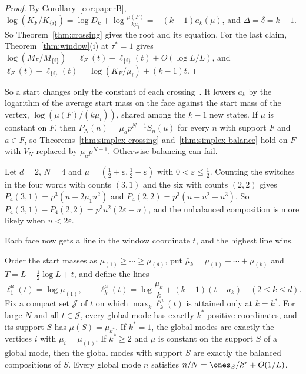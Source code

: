 \begin{proof}
By Corollary~\ref{cor:paperB}, $\log(K_F/K_{\{i\}})=\log D_k+\log\frac{\mu(F)}{k\mu_i}=-(k-1)a_k(\mu)$,
and $\Delta=\delta=k-1$. So Theorem~\ref{thm:crossing} gives the root and its equation. For the
last claim, Theorem~\ref{thm:window}(i) at $\tau^*=1$ gives
$\log(M_F/M_{\{i\}})=\ell_F(t)-\ell_{\{i\}}(t)+O(\log L/L)$, and
$\ell_F(t)-\ell_{\{i\}}(t)=\log(K_F/\mu_i)+(k-1)t$.
\end{proof}

So a start changes only the constant of each crossing~\cite[Theorem~4.4]{paperB}. It lowers
$a_k$ by the logarithm of the average start mass on the face against the start mass of the
vertex, $\log(\mu(F)/(k\mu_i))$, shared among the $k-1$ new states.
If $\mu$ is constant on $F$, then $P_N(n)=\mu_ap^{N-1}S_n(u)$ for every $n$ with support $F$
and $a\in F$, so Theorems~\ref{thm:simplex-crossing} and~\ref{thm:simplex-balance} hold on $F$
with $V_N$ replaced by $\mu_ap^{N-1}$. Otherwise balancing can fail.

\begin{remark}\label{ex:start-balance}
Let $d=2$, $N=4$ and $\mu=(\frac12+\varepsilon,\frac12-\varepsilon)$ with
$0<\varepsilon\le\frac12$. Counting the switches in the four words with counts
$(3,1)$ and the six with counts $(2,2)$ gives $P_4(3,1)=p^3(u+2\mu_1u^2)$
and $P_4(2,2)=p^3(u+u^2+u^3)$. So
$P_4(3,1)-P_4(2,2)=p^3u^2(2\varepsilon-u)$, and the unbalanced composition is
more likely when $u<2\varepsilon$.
\end{remark}

Each face now gets a line in the window coordinate $t$, and the highest line wins.

\begin{corollary}\label{cor:start-modes}
Order the start masses as $\mu_{(1)}\ge\cdots\ge\mu_{(d)}$, put
$\bar\mu_k=\mu_{(1)}+\cdots+\mu_{(k)}$ and $T=L-\frac12\log L+t$, and define the lines
\[
 \ell^\mu_1(t)=\log\mu_{(1)},\qquad
 \ell^\mu_k(t)=\log\frac{\bar\mu_k}k+(k-1)(t-a_k)\quad(2\le k\le d).
\]
Fix a compact set $\mathcal J$ of $t$ on which $\max_k\ell^\mu_k(t)$ is attained
only at $k=k^*$. For large $N$ and all $t\in\mathcal J$, every global mode has exactly $k^*$
positive coordinates, and its support $S$ has $\mu(S)=\bar\mu_{k^*}$. If $k^*=1$, the global
modes are exactly the vertices $i$ with $\mu_i=\mu_{(1)}$. If $k^*\ge2$ and $\mu$ is constant on
the support $S$ of a global mode, then the global modes with support $S$ are exactly the balanced
compositions of $S$. Every global mode $n$ satisfies $n/N=\ones_S/k^*+O(1/L)$.
\end{corollary}

